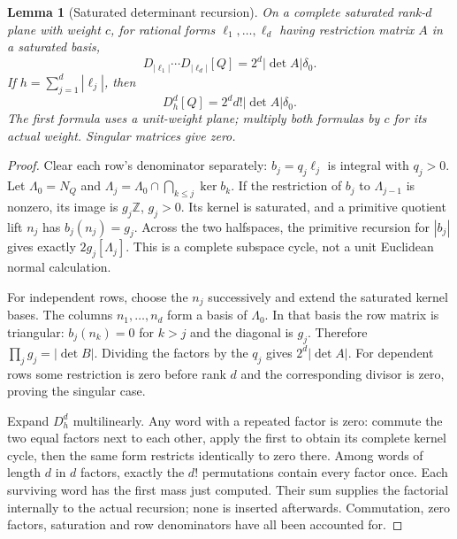 \documentclass[11pt]{article}
\newtheorem{lemma}[theorem]{Lemma}
\newcommand{\Z}{\mathbb Z}
\begin{document}
\begin{lemma}[Saturated determinant recursion]\label{determinant}
On a complete saturated rank-$d$ plane with weight $c$, for rational forms $\ell_1,\ldots,\ell_d$ having restriction matrix $A$ in a saturated basis,
\[
 D_{|\ell_1|}\cdots D_{|\ell_d|}[Q]
           =2^d|\det A|\delta_0.
\]
If $h=\sum_{j=1}^d|\ell_j|$, then
\[
 D_h^d[Q]=2^d d!|\det A|\delta_0.
\]
The first formula uses a unit-weight plane; multiply both formulas by $c$ for its actual weight. Singular matrices give zero.
\end{lemma}
\begin{proof}
Clear each row's denominator separately: $b_j=q_j\ell_j$ is integral with $q_j>0$. Let $\Lambda_0=N_Q$ and $\Lambda_j=\Lambda_0\cap\bigcap_{k\leq j}\ker b_k$. If the restriction of $b_j$ to $\Lambda_{j-1}$ is nonzero, its image is $g_j\Z$, $g_j>0$. Its kernel is saturated, and a primitive quotient lift $n_j$ has $b_j(n_j)=g_j$. Across the two halfspaces, the primitive recursion for $|b_j|$ gives exactly $2g_j[\Lambda_j]$. This is a complete subspace cycle, not a unit Euclidean normal calculation.

For independent rows, choose the $n_j$ successively and extend the saturated kernel bases. The columns $n_1,\ldots,n_d$ form a basis of $\Lambda_0$. In that basis the row matrix is triangular: $b_j(n_k)=0$ for $k>j$ and the diagonal is $g_j$. Therefore $\prod_jg_j=|\det B|$. Dividing the factors by the $q_j$ gives $2^d|\det A|$. For dependent rows some restriction is zero before rank $d$ and the corresponding divisor is zero, proving the singular case.

Expand $D_h^d$ multilinearly. Any word with a repeated factor is zero: commute the two equal factors next to each other, apply the first to obtain its complete kernel cycle, then the same form restricts identically to zero there. Among words of length $d$ in $d$ factors, exactly the $d!$ permutations contain every factor once. Each surviving word has the first mass just computed. Their sum supplies the factorial internally to the actual recursion; none is inserted afterwards. Commutation, zero factors, saturation and row denominators have all been accounted for.
\end{proof}
\end{document}
